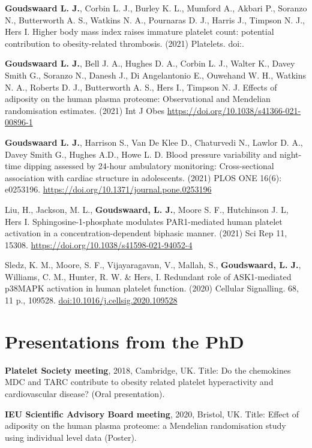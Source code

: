 \documentclass[11pt,twoside]{bristolthesis}
\begin{document}
\textbf{Goudswaard L. J.}, Corbin L. J., Burley K. L., Mumford A., Akbari P., Soranzo N., Butterworth A. S., Watkins N. A., Pournaras D. J., Harris J., Timpson N. J., Hers I. Higher body mass index raises immature platelet count: potential contribution to obesity-related thrombosis. (2021) Platelets. doi:.

\textbf{Goudswaard L. J.}, Bell J. A., Hughes D. A., Corbin L. J., Walter K., Davey Smith G., Soranzo N., Danesh J., Di Angelantonio E., Ouwehand W. H., Watkins N. A., Roberts D. J., Butterworth A. S., Hers I., Timpson N. J. Effects of adiposity on the human plasma proteome: Observational and Mendelian randomisation estimates. (2021) Int J Obes \url{https://doi.org/10.1038/s41366-021-00896-1}

\textbf{Goudswaard L. J.}, Harrison S., Van De Klee D., Chaturvedi N., Lawlor D. A., Davey Smith G., Hughes A.D., Howe L. D. Blood pressure variability and night-time dipping assessed by 24-hour ambulatory monitoring: Cross-sectional association with cardiac structure in adolescents. (2021) PLOS ONE 16(6): e0253196. \url{https://doi.org/10.1371/journal.pone.0253196}

Liu, H., Jackson, M. L., \textbf{Goudswaard, L. J.}, Moore S. F., Hutchinson J. L, Hers I. Sphingosine-1-phosphate modulates PAR1-mediated human platelet activation in a concentration-dependent biphasic manner. (2021) Sci Rep 11, 15308. \url{https://doi.org/10.1038/s41598-021-94052-4}

Sledz, K. M., Moore, S. F., Vijayaragavan, V., Mallah, S., \textbf{Goudswaard, L. J.}, Williams, C. M., Hunter, R. W. \& Hers, I. Redundant role of ASK1-mediated p38MAPK activation in human platelet function. (2020) Cellular Signalling. 68, 11 p., 109528. \url{doi:10.1016/j.cellsig.2020.109528}

\hypertarget{presentations-from-the-phd}{%
\section{Presentations from the PhD}\label{presentations-from-the-phd}}

\textbf{Platelet Society meeting}, 2018, Cambridge, UK. Title: Do the chemokines MDC and TARC contribute to obesity related platelet hyperactivity and cardiovascular disease? (Oral presentation).

\textbf{IEU Scientific Advisory Board meeting}, 2020, Bristol, UK. Title: Effect of adiposity on the human plasma proteome: a Mendelian randomisation study using individual level data (Poster).
\end{document}
